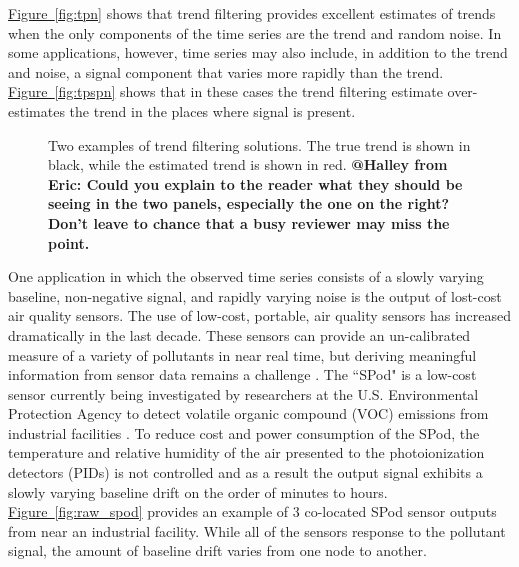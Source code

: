 \documentclass[12pt]{article}
\makeatletter
\newcommand{\Halley}[2]{{\bf {\color{purple}@Halley from #1: #2}}\xspace}
\newcommand{\Fig}[1]{\hyperref[fig:#1]{Figure~\ref*{fig:#1}}} %
\newcommand{\Fig}[1]{{Figure~\ref{fig:#1}}} %
\makeatother
\begin{document}
	\Fig{tpn} shows that trend filtering provides excellent estimates of trends when the only components of the time series are the trend and random noise. In some applications, however, time series may also include, in addition to the trend and noise, a signal component that varies more rapidly than the trend. 
	\Fig{tpspn} shows that in these cases the trend filtering estimate over-estimates the trend in the places where signal is present.
	   	
	\begin{figure}[t]
		\centering
		\caption{Two examples of trend filtering solutions. The true trend is shown in black, while the estimated trend is shown in red. \Halley{Eric}{Could you explain to the reader what they should be seeing in the two panels, especially the one on the right? Don't leave to chance that a busy reviewer may miss the point.}}		
		\label{fig:trendfilter}
	\end{figure}
	 
	
	One application in which the observed time series consists of a slowly varying baseline, non-negative signal, and rapidly varying noise is the output of lost-cost air quality sensors. The use of low-cost, portable, air quality sensors has increased dramatically in the last decade. These sensors can provide an un-calibrated measure of a variety of pollutants in near real time, but deriving meaningful information from sensor data remains a challenge \citep{snyder2013changing}. The ``SPod" is a low-cost sensor currently being investigated by researchers at the U.S. Environmental Protection Agency to detect volatile organic compound (VOC) emissions from industrial facilities \citep{thoma2016south}. To reduce cost and power consumption of the SPod, the temperature and relative humidity of the air presented to the photoionization detectors (PIDs) is not controlled and as a result the output signal exhibits a slowly varying baseline drift on the order of minutes to hours. \Fig{raw_spod} provides an example of 3 co-located SPod sensor outputs from near an industrial facility. While all of the sensors response to the pollutant signal, the amount of baseline drift varies from one node to another.
	 
\end{document}

